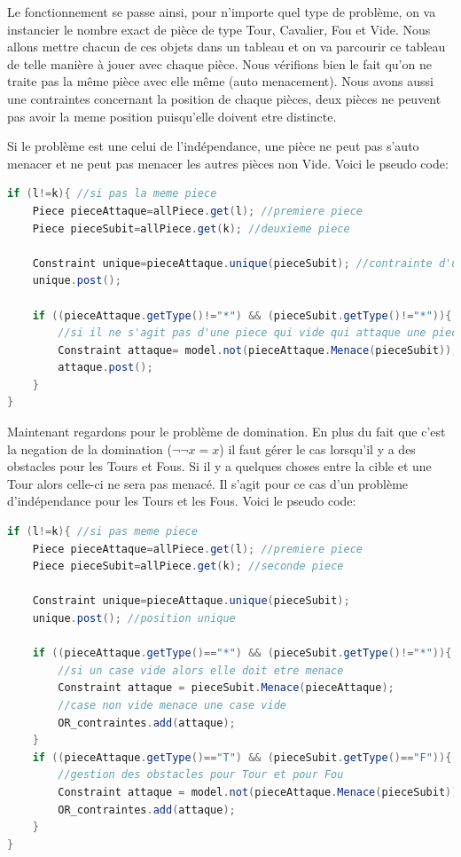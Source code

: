 \documentclass[a4paper,10pt]{article}
\begin{document}
\par Le fonctionnement se passe ainsi, pour n'importe quel type de problème, on va instancier le nombre exact de pièce de type Tour, Cavalier, Fou et Vide. Nous allons mettre chacun de ces objets dans un tableau et on va parcourir ce tableau de telle manière à jouer avec chaque pièce. Nous vérifions bien le fait qu'on ne traite pas la même pièce avec elle même (auto menacement). Nous avons aussi une contraintes concernant la position de chaque pièces, deux pièces ne peuvent pas avoir la meme position puisqu'elle doivent etre distincte.
\par Si le problème est une celui de l'indépendance, une pièce ne peut pas s'auto menacer et ne peut pas menacer les autres pièces non Vide. Voici le pseudo code:
\begin{lstlisting}[language=Java,basicstyle=\tiny]
if (l!=k){ //si pas la meme piece
	Piece pieceAttaque=allPiece.get(l); //premiere piece
	Piece pieceSubit=allPiece.get(k); //deuxieme piece
					
	Constraint unique=pieceAttaque.unique(pieceSubit); //contrainte d'unicite
	unique.post();
					
	if ((pieceAttaque.getType()!="*") && (pieceSubit.getType()!="*")){
		//si il ne s'agit pas d'une piece qui vide qui attaque une piece vide
		Constraint attaque= model.not(pieceAttaque.Menace(pieceSubit));
		attaque.post();	
	}
}
\end{lstlisting}

\par Maintenant regardons pour le problème de domination. En plus du fait que c'est la negation de la domination ($\neg \neg x=x$) il faut gérer le cas lorsqu'il y a des obstacles pour les Tours et Fous. Si il y a quelques choses entre la cible et une Tour alors celle-ci ne sera pas menacé. Il s'agit pour ce cas d'un problème d'indépendance pour les Tours et les Fous. Voici le pseudo code:
\begin{lstlisting}[language=Java,basicstyle=\tiny]
if (l!=k){ //si pas meme piece
	Piece pieceAttaque=allPiece.get(l); //premiere piece
	Piece pieceSubit=allPiece.get(k); //seconde piece
		
	Constraint unique=pieceAttaque.unique(pieceSubit);
	unique.post(); //position unique
			
	if ((pieceAttaque.getType()=="*") && (pieceSubit.getType()!="*")){
		//si un case vide alors elle doit etre menace
		Constraint attaque = pieceSubit.Menace(pieceAttaque); 
		//case non vide menace une case vide
		OR_contraintes.add(attaque);
	}
	if ((pieceAttaque.getType()=="T") && (pieceSubit.getType()=="F")){
		//gestion des obstacles pour Tour et pour Fou
		Constraint attaque = model.not(pieceAttaque.Menace(pieceSubit));
		OR_contraintes.add(attaque);
	}
}
\end{lstlisting}
\end{document}
